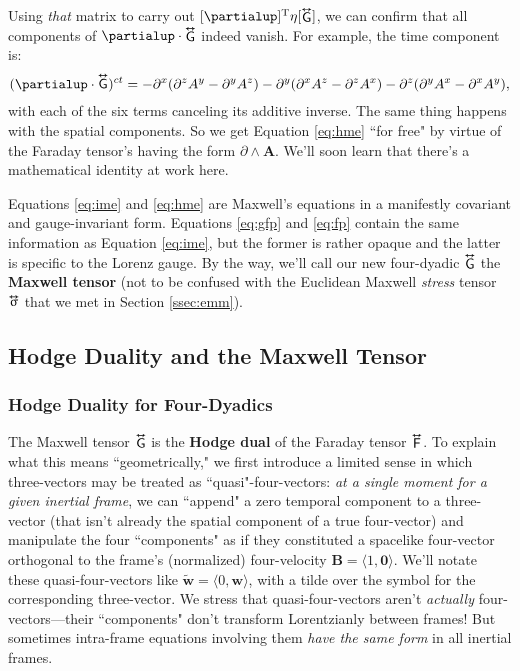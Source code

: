 \documentclass[12pt]{article}
\renewcommand{\vv}[1]{\mathbf{#1}}
\newcommand{\tightoverset}[2]{%
  \mathop{#2}\limits^{\vbox to -.5ex{\kern-0.75ex\hbox{$#1$}\vss}}}
\newcommand{\inlinedy}[1]{\tightoverset{\text{\tiny$\bm\leftrightarrow$}}{#1}}
\newcommand{\capdy}[1]{ \overset{ \text{\tiny$\bm\leftrightarrow$} }{\vphantom{\text{\small{A}}}\smash{#1}} }
\begin{document}
Using \emph{that} matrix to carry out $[\partialup]^{\mathrm{T}} \eta [\inlinedy{\mathsf{G}}]$, we can confirm that all components of $\partialup \cdot \inlinedy{\mathsf{G}}$ indeed vanish. For example, the time component is:
\begin{equation*}
(\partialup \cdot \capdy{\mathsf{G}})^{ct} = - \partial^x ( \partial^z A^y - \partial^y A^z ) - \partial^y ( \partial^x A^z - \partial^z A^x ) - \partial^z ( \partial^y A^x - \partial^x A^y ) ,
\end{equation*}
with each of the six terms canceling its additive inverse. The same thing happens with the spatial components. So we get Equation \ref{eq:hme} ``for free" by virtue of the Faraday tensor's having the form $\partialup \wedge \vv A$. We'll soon learn that there's a mathematical identity at work here.

Equations \ref{eq:ime} and \ref{eq:hme} are Maxwell's equations in a manifestly covariant and gauge-invariant form. Equations \ref{eq:gfp} and \ref{eq:fp} contain the same information as Equation \ref{eq:ime}, but the former is rather opaque and the latter is specific to the Lorenz gauge. By the way, we'll call our new four-dyadic $\inlinedy{\mathsf{G}}$ the \textbf{Maxwell tensor} (not to be confused with the Euclidean Maxwell \emph{stress} tensor $\inlinedy{\upsigma}$ that we met in Section \ref{ssec:emm}).


\subsection{Hodge Duality and the Maxwell Tensor}

\subsubsection{Hodge Duality for Four-Dyadics}\label{sssec:hd}

The Maxwell tensor $\inlinedy{\mathsf{G}}$ is the \textbf{Hodge dual} of the Faraday tensor $\inlinedy{\mathsf{F}}$. To explain what this means ``geometrically," we first introduce a limited sense in which three-vectors may be treated as ``quasi"-four-vectors: \emph{at a single moment for a given inertial frame}, we can ``append" a zero temporal component to a three-vector (that isn't already the spatial component of a true four-vector) and manipulate the four ``components" as if they constituted a spacelike four-vector orthogonal to the frame's (normalized) four-velocity $\vv B = \langle 1, \vv 0 \rangle$. We'll notate these quasi-four-vectors like $\tilde{\vv w} = \langle 0, \vv w \rangle$, with a tilde over the symbol for the corresponding three-vector. We stress that quasi-four-vectors aren't \emph{actually} four-vectors---their ``components" don't transform Lorentzianly between frames! But sometimes intra-frame equations involving them \emph{have the same form} in all inertial frames.
\end{document}
